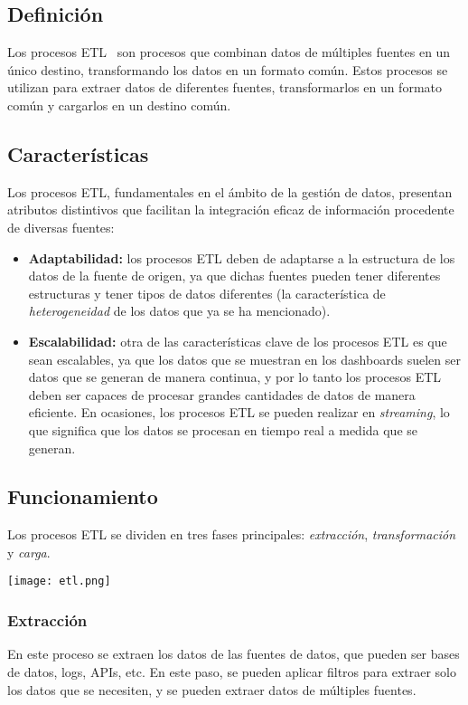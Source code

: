 \subsection{Definición}
Los procesos ETL~\cite{mier2023dashboards} son procesos que combinan datos de múltiples
fuentes en un único destino, transformando los datos en un formato común. Estos procesos
se utilizan para extraer datos de diferentes fuentes, transformarlos en un formato común
y cargarlos en un destino común.

\subsection{Características}
Los procesos ETL, fundamentales en el ámbito de la gestión de datos, presentan atributos
distintivos que facilitan la integración eficaz de información procedente de diversas fuentes:

\begin{itemize}
	\item \textbf{Adaptabilidad:} los procesos ETL deben de adaptarse a la estructura de los
		datos de la fuente de origen, ya que dichas fuentes pueden tener diferentes estructuras
		y tener tipos de datos diferentes (la característica de \textit{heterogeneidad} de los
		datos que ya se ha mencionado).
	\item \textbf{Escalabilidad:} otra de las características clave de los procesos ETL es que sean
		escalables, ya que los datos que se muestran en los dashboards suelen ser datos que se generan
		de manera continua, y por lo tanto los procesos ETL deben ser capaces de procesar grandes
		cantidades de datos de manera eficiente. En ocasiones, los procesos ETL se pueden realizar en
		\textit{streaming}, lo que significa que los datos se procesan en tiempo real a medida que se
		generan.
\end{itemize}

\newpage{}
\subsection{Funcionamiento}
Los procesos ETL se dividen en tres fases principales: \textit{extracción}, \textit{transformación}
y \textit{carga}.

\begin{minipage}{\linewidth}
	\centering
	\texttt{[image: etl.png]}
\end{minipage}

\subsubsection{Extracción}
En este proceso se extraen los datos de las fuentes de datos, que pueden ser bases de datos, logs,
APIs, etc. En este paso, se pueden aplicar filtros para extraer solo los datos que se necesiten, y
se pueden extraer datos de múltiples fuentes.

